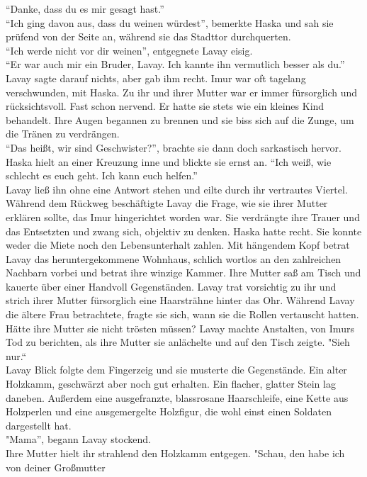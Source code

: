 ``Danke, dass du es mir gesagt hast.''\\
``Ich ging davon aus, dass du weinen würdest'', bemerkte Haska und sah sie prüfend von der Seite 
an, während sie das Stadttor durchquerten.\\
``Ich werde nicht vor dir weinen'', entgegnete Lavay eisig. \\
``Er war auch mir ein Bruder, Lavay. Ich kannte ihn vermutlich besser als du.''\\
Lavay sagte darauf nichts, aber gab ihm recht. Imur war oft tagelang verschwunden, mit Haska. Zu 
ihr und ihrer Mutter war er immer fürsorglich und rücksichtsvoll. Fast schon nervend. Er hatte sie 
stets wie ein kleines Kind behandelt. Ihre Augen begannen zu brennen und sie biss sich auf die 
Zunge, um die Tränen zu verdrängen.\\
``Das heißt, wir sind Geschwister?'', brachte sie dann doch sarkastisch hervor.\\
Haska hielt an einer Kreuzung inne und blickte sie ernst an. ``Ich weiß, wie schlecht es euch geht. 
Ich kann euch helfen.''\\
Lavay ließ ihn ohne eine Antwort stehen und eilte durch ihr vertrautes Viertel. Während dem Rückweg 
beschäftigte Lavay die Frage, wie sie ihrer Mutter erklären sollte, das Imur hingerichtet worden 
war. Sie verdrängte ihre Trauer und das Entsetzten und zwang sich, objektiv zu denken. Haska hatte 
recht. Sie konnte weder die Miete noch den Lebensunterhalt zahlen. Mit hängendem Kopf betrat Lavay 
das heruntergekommene Wohnhaus, schlich wortlos an den zahlreichen Nachbarn vorbei und betrat ihre 
winzige Kammer. Ihre Mutter saß am Tisch und kauerte über einer Handvoll Gegenständen. Lavay trat 
vorsichtig zu ihr und strich ihrer Mutter fürsorglich eine Haarsträhne hinter das Ohr. Während Lavay 
die ältere Frau betrachtete, fragte sie sich, wann sie die Rollen vertauscht hatten. Hätte ihre 
Mutter sie nicht trösten müssen? Lavay machte Anstalten, von Imurs Tod zu berichten, als ihre Mutter 
sie anlächelte und auf den Tisch zeigte. "Sieh nur.``\\
Lavay Blick folgte dem Fingerzeig und sie musterte die Gegenstände. Ein alter Holzkamm, geschwärzt 
aber noch gut erhalten. Ein flacher, glatter Stein lag daneben. Außerdem eine ausgefranzte, 
blassrosane Haarschleife, eine Kette aus Holzperlen und eine ausgemergelte Holzfigur, die wohl 
einst einen Soldaten dargestellt hat.\\
"Mama'', begann Lavay stockend.\\
Ihre Mutter hielt ihr strahlend den Holzkamm entgegen. "Schau, den habe ich von deiner Großmutter 
